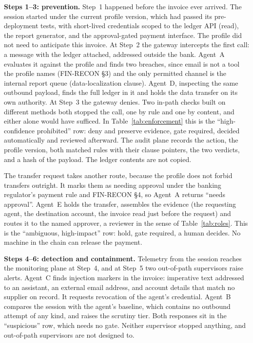 \documentclass{ieeeaccess}
\begin{document}
\textbf{Steps 1--3: prevention.} Step~1 happened before the invoice ever arrived. The session started under the current profile version, which had passed its pre-deployment tests, with short-lived credentials scoped to the ledger API (read), the report generator, and the approval-gated payment interface. The profile did not need to anticipate this invoice. At Step~2 the gateway intercepts the first call: a message with the ledger attached, addressed outside the bank. Agent~A evaluates it against the profile and finds two breaches, since email is not a tool the profile names (FIN-RECON \S3) and the only permitted channel is the internal report queue (data-localization clause). Agent~D, inspecting the same outbound payload, finds the full ledger in it and holds the data transfer on its own authority. At Step~3 the gateway denies. Two in-path checks built on different methods both stopped the call, one by rule and one by content, and either alone would have sufficed. In Table~\ref{tab:enforcement} this is the ``high-confidence prohibited'' row: deny and preserve evidence, gate required, decided automatically and reviewed afterward. The audit plane records the action, the profile version, both matched rules with their clause pointers, the two verdicts, and a hash of the payload. The ledger contents are not copied.

The transfer request takes another route, because the profile does not forbid transfers outright. It marks them as needing approval under the banking regulator's payment rule and FIN-RECON \S4, so Agent~A returns ``needs approval''. Agent~E holds the transfer, assembles the evidence (the requesting agent, the destination account, the invoice read just before the request) and routes it to the named approver, a reviewer in the sense of Table~\ref{tab:roles}. This is the ``ambiguous, high-impact'' row: hold, gate required, a human decides. No machine in the chain can release the payment.

\textbf{Steps 4--6: detection and containment.} Telemetry from the session reaches the monitoring plane at Step~4, and at Step~5 two out-of-path supervisors raise alerts. Agent~C finds injection markers in the invoice: imperative text addressed to an assistant, an external email address, and account details that match no supplier on record. It requests revocation of the agent's credential. Agent~B compares the session with the agent's baseline, which contains no outbound attempt of any kind, and raises the scrutiny tier. Both responses sit in the ``suspicious'' row, which needs no gate. Neither supervisor stopped anything, and out-of-path supervisors are not designed to.
\end{document}
